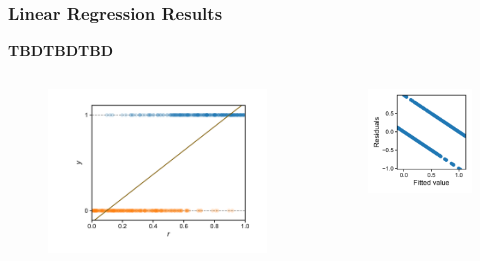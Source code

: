 \documentclass[10pt,aspectratio=169]{beamer}
\begin{document}
\begin{frame}
  \frametitle{Linear Regression Results}
  \textbf{TBDTBDTBD}
  \begin{columns}
    \begin{column}{0.5\textwidth}
      \begin{figure}[t]
        \includegraphics[width=\textwidth]{scripts/coin_linear_fit.pdf}
      \end{figure}
    \end{column}

    \begin{column}{0.5\textwidth}
      \begin{figure}[t]
        \includegraphics[width=\textwidth]{scripts/coin_linear_res.pdf}
      \end{figure}
    \end{column}
  \end{columns}
\end{frame}
  
\end{document}
